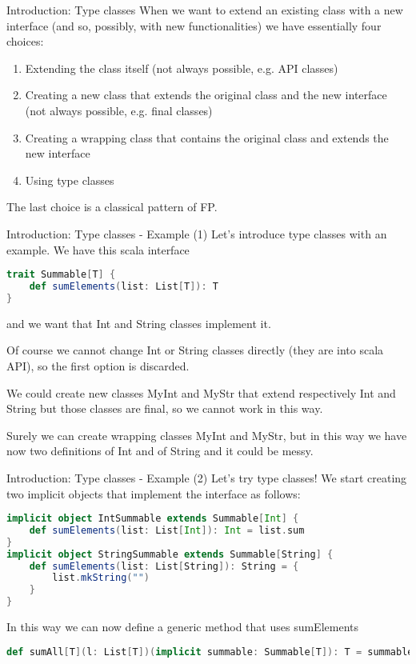 \begin{frame}{Introduction: Type classes}
	When we want to extend an existing class with a new interface 
	(and so, possibly, with new functionalities) we have essentially four choices:	
	\begin{enumerate}[<+->]
		\item Extending the class itself (not always possible, e.g. API classes)
		\item Creating a new class that extends the original class and the new interface (not always possible, e.g. final classes)
		\item Creating a wrapping class that contains the original class and extends the new interface
		\item Using type classes
	\end{enumerate}
	\pause[4]
	The last choice is a classical pattern of FP.			
\end{frame}

\begin{frame}[fragile]{Introduction: Type classes - Example (1)}
	Let's introduce type classes with an example.
	We have this scala interface
\begin{lstlisting}[language=scala]
trait Summable[T] {
	def sumElements(list: List[T]): T
}
\end{lstlisting}
	and we want that Int and String classes implement it.

	\pause

	Of course we cannot change Int or String classes directly (they are into scala API), so the first option is discarded.
	
	\pause
	
	We could create new classes MyInt and MyStr that extend respectively Int and String but those classes are final, so we cannot work in 
	this way.
	
	\pause
	
	Surely we can create wrapping classes MyInt and MyStr, but in this way we have now two definitions of Int and of String and 
	it could be messy.
\end{frame}

\begin{frame}[fragile]{Introduction: Type classes - Example (2)}	
	Let's try type classes!
	We start creating two implicit objects that implement the interface as follows:
\begin{lstlisting}[language=scala]
implicit object IntSummable extends Summable[Int] {
	def sumElements(list: List[Int]): Int = list.sum
}
implicit object StringSummable extends Summable[String] {
	def sumElements(list: List[String]): String = {
		list.mkString("")
	}
}
\end{lstlisting}

	\pause

	In this way we can now define a generic method that uses sumElements
\begin{lstlisting}[language=scala]
def sumAll[T](l: List[T])(implicit summable: Summable[T]): T = summable.sumElements(l)		
\end{lstlisting}	
\end{frame}


